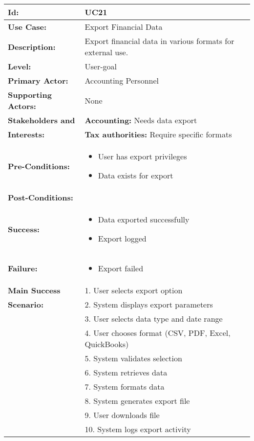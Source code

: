 \documentclass[12pt]{article}
\begin{document}
\begin{tabular}{|p{3cm}|p{11cm}|}
\hline
\textbf{Id:} & UC21 \\
\hline
\textbf{Use Case:} & Export Financial Data \\
\hline
\textbf{Description:} & Export financial data in various formats for external use. \\
\hline
\textbf{Level:} & User-goal \\
\hline
\textbf{Primary Actor:} & Accounting Personnel \\
\hline
\textbf{Supporting Actors:} & None \\
\hline
\textbf{Stakeholders and} & \textbf{Accounting:} Needs data export \\
\textbf{Interests:} & \textbf{Tax authorities:} Require specific formats \\
\hline
\textbf{Pre-Conditions:} & 
\begin{itemize}
    \item User has export privileges
    \item Data exists for export
\end{itemize} \\
\hline
\textbf{Post-Conditions:} & \\
\textbf{Success:} & 
\begin{itemize}
    \item Data exported successfully
    \item Export logged
\end{itemize} \\
\textbf{Failure:} & 
\begin{itemize}
    \item Export failed
\end{itemize} \\
\hline
\textbf{Main Success} & 1. User selects export option \\
\textbf{Scenario:} & 2. System displays export parameters \\
& 3. User selects data type and date range \\
& 4. User chooses format (CSV, PDF, Excel, QuickBooks) \\
& 5. System validates selection \\
& 6. System retrieves data \\
& 7. System formats data \\
& 8. System generates export file \\
& 9. User downloads file \\
& 10. System logs export activity \\

\end{tabular}
\end{document}
